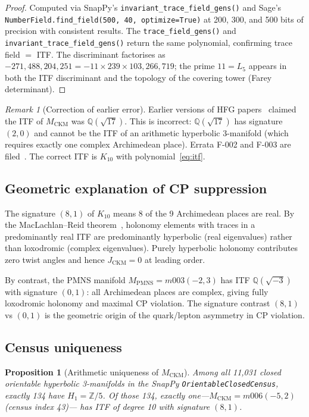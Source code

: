 \documentclass[11pt,a4paper]{article}
\newtheorem{proposition}[theorem]{Proposition}
\theoremstyle{remark}
\newtheorem{remark}[theorem]{Remark}
\newcommand{\MCKM}{M_{\mathrm{CKM}}}
\newcommand{\MPMNS}{M_{\mathrm{PMNS}}}
\newcommand{\Zfive}{\mathbb{Z}/5}
\newcommand{\QQ}{\mathbb{Q}}
\newcommand{\Kten}{K_{10}}
\begin{document}
\begin{proof}
Computed via SnapPy's \texttt{invariant\_trace\_field\_gens()} and
Sage's \texttt{NumberField.find\_field(500,\,40,\,optimize=True)} at
200, 300, and 500 bits of precision with consistent results.
The \texttt{trace\_field\_gens()} and \texttt{invariant\_trace\_field\_gens()}
return the same polynomial, confirming trace field $=$ ITF.
The discriminant factorises as
$-271{,}488{,}204{,}251 = -11 \times 239 \times 103{,}266{,}719$;
the prime $11 = L_5$ appears in both the ITF discriminant and the
topology of the covering tower (Farey determinant).
\end{proof}

\begin{remark}[Correction of earlier error]
Earlier versions of HFG papers~\cite{Gentry:Unified} claimed the ITF
of $\MCKM$ was $\QQ(\sqrt{17})$.
This is incorrect: $\QQ(\sqrt{17})$ has signature $(2,0)$ and cannot
be the ITF of an arithmetic hyperbolic 3-manifold (which requires
exactly one complex Archimedean place).
Errata F-002 and F-003 are filed~\cite{Gentry:Unified}.
The correct ITF is $\Kten$ with polynomial~\eqref{eq:itf}.
\end{remark}

\subsection{Geometric explanation of CP suppression}

The signature $(8,1)$ of $\Kten$ means 8 of the 9 Archimedean places
are real.
By the MacLachlan--Reid theorem~\cite{MaclachlanReid}, holonomy
elements with traces in a predominantly real ITF are predominantly
hyperbolic (real eigenvalues) rather than loxodromic (complex
eigenvalues).
Purely hyperbolic holonomy contributes zero twist angles and hence
$J_\mathrm{CKM} = 0$ at leading order.

By contrast, the PMNS manifold $\MPMNS = m003(-2,3)$ has ITF
$\QQ(\sqrt{-3})$ with signature $(0,1)$: all Archimedean places are
complex, giving fully loxodromic holonomy and maximal CP violation.
The signature contrast $(8,1)$ vs $(0,1)$ is the geometric origin of
the quark/lepton asymmetry in CP violation.

\subsection{Census uniqueness}

\begin{proposition}[Arithmetic uniqueness of $\MCKM$]
\label{prop:unique}
Among all 11,031 closed orientable hyperbolic 3-manifolds in the
SnapPy \texttt{OrientableClosedCensus}, exactly 134 have
$H_1 = \Zfive$.
Of those 134, exactly one---$\MCKM = m006(-5,2)$ (census index 43)---%
has ITF of degree 10 with signature $(8,1)$.
\end{proposition}
\end{document}
